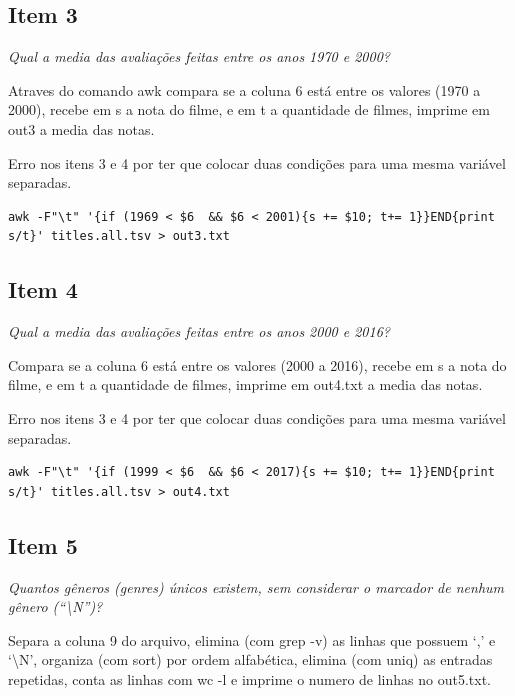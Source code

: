 \documentclass[12pt]{article}
\begin{document}
\clearpage

\subsection*{Item 3}

\noindent\emph{Qual a media das avaliações feitas entre os anos 1970 e 2000?}
\vspace{1em}

Atraves do comando awk compara se a coluna 6 está entre os valores (1970 a 2000), recebe em s a nota do filme, e em t a quantidade de filmes, imprime em out3 a media das notas.

Erro nos itens 3 e 4 por ter que colocar duas condições para uma mesma variável separadas.

\begin{verbatim}
awk -F"\t" '{if (1969 < $6  && $6 < 2001){s += $10; t+= 1}}END{print s/t}' titles.all.tsv > out3.txt
\end{verbatim}

\subsection*{Item 4}

\noindent\emph{Qual a media das avaliações feitas entre os anos 2000 e 2016?}
\vspace{1em}

Compara se a coluna 6 está entre os valores (2000 a 2016), recebe em s a nota do filme, e em t a quantidade de filmes, imprime em out4.txt a media das notas.

Erro nos itens 3 e 4 por ter que colocar duas condições para uma mesma variável separadas.

\begin{verbatim}
awk -F"\t" '{if (1999 < $6  && $6 < 2017){s += $10; t+= 1}}END{print s/t}' titles.all.tsv > out4.txt
\end{verbatim}

\subsection*{Item 5}

\noindent\emph{Quantos gêneros (genres) únicos existem, sem considerar o marcador de nenhum gênero (``\textbackslash N'')?}
\vspace{1em}

Separa a coluna 9 do arquivo, elimina (com grep -v) as linhas que possuem `,' e `\textbackslash	N', organiza (com sort) por ordem alfabética, elimina (com uniq) as entradas repetidas, conta as linhas com wc -l e imprime o numero de linhas no out5.txt.
\end{document}
